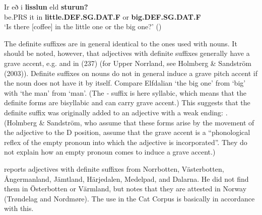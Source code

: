 

 \ea\label{}
\gll Ir  eð  i  \textbf{lisslun} eld  \textbf{sturun?}\\


be.PRS  it  in  \textbf{little.DEF.SG.DAT.F} or  \textbf{big.DEF.SG.DAT.F}\\

\glt ‘Is there [coffee] in the little one or the big one?’ (\citet[53]{Levander1909})

\z

The definite suffixes are in general identical to the ones used with nouns. It should be noted, however, that adjectives with definite suffixes generally have a grave accent, e.g.  and  in (237) (for Upper Norrland, see Holmberg \& Sandström (2003)). Definite suffixes on nouns do not in general induce a grave pitch accent if the noun does not have it by itself. Compare Elfdalian  ‘the big one’ from  ‘big’ with  ‘the man’ from  ‘man’. (The\textit{ {}-} suffix is here syllabic, which means that the definite forms are bisyllabic and can carry grave accent.) This suggests that the definite suffix was originally added to an adjective with a weak ending: . (Holmberg \& Sandström, who assume that these forms arise by the movement of the adjective to the D position, assume that the grave accent is a “phonological reflex of the empty pronoun into which the adjective is incorporated”. They do not explain how an empty pronoun comes to induce a grave accent.) 


\citet[51]{Delsing2003a} reports adjectives with definite suffixes from Norrbotten, Västerbotten, Ångermanland, Jämtland, Härjedalen, Medelpad, and Dalarna. He did not find them in Österbotten or Värmland, but notes that they are attested in Norway (Trøndelag and Nordmøre). The use in the Cat Corpus is basically in accordance with this. 


